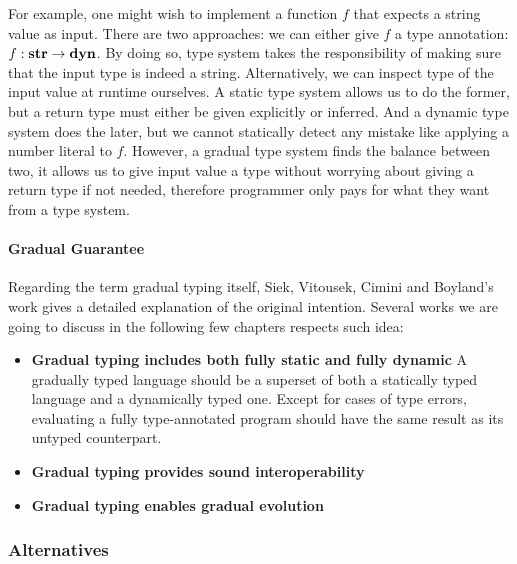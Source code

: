For example, one might wish to implement a function $f$ that expects a string value
as input. There are two approaches: we can either give $f$ a type annotation:
$f : \textbf{str} \rightarrow \textbf{dyn}$. By doing so, type system takes the responsibility
of making sure that the input type is indeed a string. Alternatively,
we can inspect type of the input value at runtime ourselves.
A static type system allows us to do the former, but a return type must either
be given explicitly or inferred. And a dynamic type system does the later, but
we cannot statically detect any mistake like applying a number literal to $f$.
However, a gradual type system finds the balance between two,
it allows us to give input value a type without worrying about
giving a return type if not needed,
therefore programmer only pays for what they want from a type system.




\paragraph{Gradual Guarantee}

Regarding the term gradual typing itself,
Siek, Vitousek, Cimini and Boyland's work gives a detailed explanation of
the original intention.
Several works we are going to discuss in the following few chapters respects
such idea:

\begin{itemize}
	\item \textbf{Gradual typing includes both fully static and fully dynamic}
	A gradually typed language should be a superset of both a statically typed
	language and a dynamically typed one.
	Except for cases of type errors, evaluating a fully type-annotated program
	should have the same result as its untyped counterpart.
	\item \textbf{Gradual typing provides sound interoperability}
	\item \textbf{Gradual typing enables gradual evolution}
\end{itemize}


\subsubsection{Alternatives}

